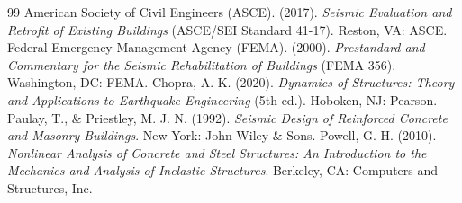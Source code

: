 \documentclass[11pt,letterpaper]{article}
\begin{document}
\begin{thebibliography}{99}
     American Society of Civil Engineers (ASCE). (2017). \textit{Seismic Evaluation and Retrofit of Existing Buildings} (ASCE/SEI Standard 41-17). Reston, VA: ASCE.
     Federal Emergency Management Agency (FEMA). (2000). \textit{Prestandard and Commentary for the Seismic Rehabilitation of Buildings} (FEMA 356). Washington, DC: FEMA.
     Chopra, A. K. (2020). \textit{Dynamics of Structures: Theory and Applications to Earthquake Engineering} (5th ed.). Hoboken, NJ: Pearson.
     Paulay, T., \& Priestley, M. J. N. (1992). \textit{Seismic Design of Reinforced Concrete and Masonry Buildings}. New York: John Wiley \& Sons.
     Powell, G. H. (2010). \textit{Nonlinear Analysis of Concrete and Steel Structures: An Introduction to the Mechanics and Analysis of Inelastic Structures}. Berkeley, CA: Computers and Structures, Inc.
\end{thebibliography}
\end{document}
